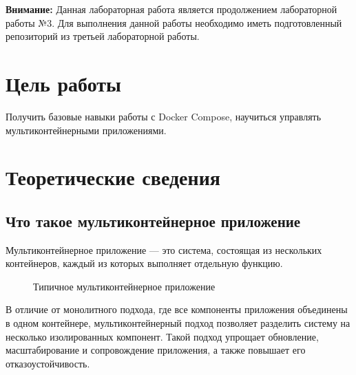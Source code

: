 \documentclass[12pt,a4paper]{article}
\begin{document}
    \makelabcover

    \commoninstructions

    \textbf{Внимание:} Данная лабораторная работа является продолжением лабораторной работы №3.
    Для выполнения данной работы необходимо иметь подготовленный репозиторий из третьей лабораторной работы.

    \section{Цель работы}

    Получить базовые навыки работы с Docker Compose, научиться управлять мультиконтейнерными приложениями.

    \section{Теоретические сведения}

    \subsection{Что такое мультиконтейнерное приложение}

    Мультиконтейнерное приложение — это система, состоящая из нескольких контейнеров, каждый из которых выполняет
    отдельную функцию.

    \begin{figure}[H]
        \centering
        
        \caption{Типичное мультиконтейнерное приложение}
        \label{fig:multicontainers-app}
    \end{figure}

    В отличие от монолитного подхода, где все компоненты приложения объединены в одном контейнере, мультиконтейнерный подход
    позволяет разделить систему на несколько изолированных компонент. Такой подход упрощает обновление, масштабирование и
    сопровождение приложения, а также повышает его отказоустойчивость.
\end{document}
